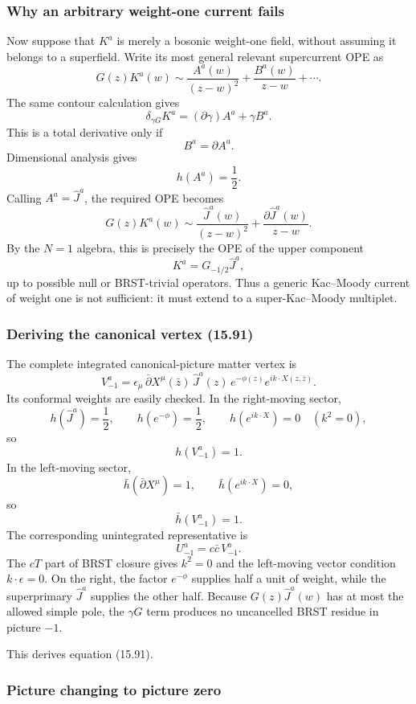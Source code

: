 \documentclass[
  10pt,
  a4paper,
  openany]{book}
\begin{document}
\subsubsection{Why an arbitrary weight-one current
fails}\label{why-an-arbitrary-weight-one-current-fails}

Now suppose that \(K^a\) is merely a bosonic weight-one field, without
assuming it belongs to a superfield. Write its most general relevant
supercurrent OPE as \[
G(z)K^a(w)
\sim
\frac{A^a(w)}{(z-w)^2}
+
\frac{B^a(w)}{z-w}
+\cdots.
\] The same contour calculation gives \[
\delta_{\gamma G}K^a
=
(\partial\gamma)A^a+\gamma B^a.
\] This is a total derivative only if \[
B^a=\partial A^a.
\] Dimensional analysis gives \[
h(A^a)=\frac12.
\] Calling \(A^a=\hat J^a\), the required OPE becomes \[
G(z)K^a(w)
\sim
\frac{\hat J^a(w)}{(z-w)^2}
+
\frac{\partial\hat J^a(w)}{z-w}.
\] By the \(N=1\) algebra, this is precisely the OPE of the upper
component \[
K^a=G_{-1/2}\hat J^a,
\] up to possible null or BRST-trivial operators. Thus a generic
Kac--Moody current of weight one is not sufficient: it must extend to a
super-Kac--Moody multiplet.

\subsubsection{Deriving the canonical vertex
(15.91)}\label{deriving-the-canonical-vertex-15.91}

The complete integrated canonical-picture matter vertex is \[
\boxed{
V_{-1}^a
=
\epsilon_\mu\,
\bar\partial X^\mu(\bar z)\,
\hat J^a(z)\,
e^{-\phi(z)}
e^{ik\cdot X(z,\bar z)}.
}
\] Its conformal weights are easily checked. In the right-moving sector,
\[
h(\hat J^a)=\frac12,
\qquad
h(e^{-\phi})=\frac12,
\qquad
h(e^{ik\cdot X})=0
\quad(k^2=0),
\] so \[
h(V_{-1}^a)=1.
\] In the left-moving sector, \[
\bar h(\bar\partial X^\mu)=1,
\qquad
\bar h(e^{ik\cdot X})=0,
\] so \[
\bar h(V_{-1}^a)=1.
\] The corresponding unintegrated representative is \[
U_{-1}^a
=
c\bar c\,V_{-1}^a.
\] The \(cT\) part of BRST closure gives \(k^2=0\) and the left-moving
vector condition \(k\cdot\epsilon=0\). On the right, the factor
\(e^{-\phi}\) supplies half a unit of weight, while the superprimary
\(\hat J^a\) supplies the other half. Because \(G(z)\hat J^a(w)\) has at
most the allowed simple pole, the \(\gamma G\) term produces no
uncancelled BRST residue in picture \(-1\).

This derives equation (15.91).

\subsubsection{Picture changing to picture
zero}\label{picture-changing-to-picture-zero}
\end{document}

